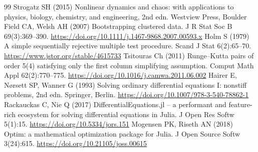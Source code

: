 \documentclass[10pt]{article}
\begin{document}
\begin{thebibliography}{99}
 Strogatz SH (2015) Nonlinear dynamics and chaos: with applications to physics, biology, chemistry, and engineering, 2nd edn. Westview Press, Boulder
 Field CA, Welsh AH (2007) Bootstrapping clustered data. J R Stat Soc B 69(3):369--390. \url{https://doi.org/10.1111/j.1467-9868.2007.00593.x}
 Holm S (1979) A simple sequentially rejective multiple test procedure. Scand J Stat 6(2):65--70. \url{https://www.jstor.org/stable/4615733}
 Tsitouras Ch (2011) Runge--Kutta pairs of order 5(4) satisfying only the first column simplifying assumption. Comput Math Appl 62(2):770--775. \url{https://doi.org/10.1016/j.camwa.2011.06.002}
 Hairer E, N{\o}rsett SP, Wanner G (1993) Solving ordinary differential equations I: nonstiff problems, 2nd edn. Springer, Berlin. \url{https://doi.org/10.1007/978-3-540-78862-1}
 Rackauckas C, Nie Q (2017) DifferentialEquations.jl -- a performant and feature-rich ecosystem for solving differential equations in Julia. J Open Res Softw 5(1):15. \url{https://doi.org/10.5334/jors.151}
 Mogensen PK, Riseth AN (2018) Optim: a mathematical optimization package for Julia. J Open Source Softw 3(24):615. \url{https://doi.org/10.21105/joss.00615}
\end{thebibliography}
\end{document}
